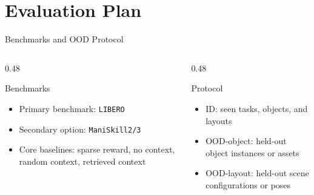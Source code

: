 \documentclass[aspectratio=169,11pt]{beamer}
\begin{document}
\section{Evaluation Plan}
\begin{frame}[t]{Benchmarks and OOD Protocol}
\small
\begin{columns}[T,totalwidth=\textwidth]
  \begin{column}{0.48\textwidth}
    \begin{block}{Benchmarks}
      \begin{itemize}
        \item Primary benchmark: \texttt{LIBERO} \citep{liu2023libero}
        \item Secondary option: \texttt{ManiSkill2/3} \citep{gu2022maniskill2,tao2024maniskill3}
        \item Core baselines: sparse reward, no context, random context, retrieved context
      \end{itemize}
    \end{block}
  \end{column}
  \begin{column}{0.48\textwidth}
    \begin{block}{Protocol}
      \begin{itemize}
        \item ID: seen tasks, objects, and layouts
        \item OOD-object: held-out object instances or assets
        \item OOD-layout: held-out scene configurations or poses
      \end{itemize}
    \end{block}
  \end{column}
\end{columns}
\end{frame}
\end{document}

